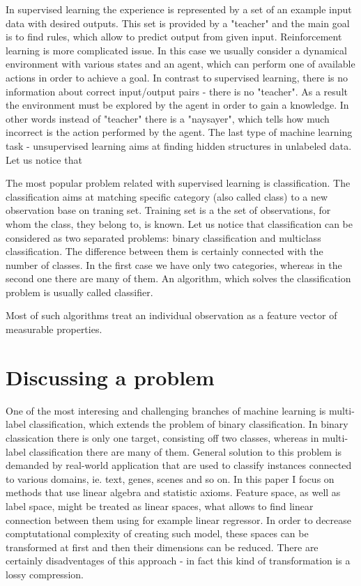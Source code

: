 In supervised learning the experience is represented by a set of an example input data with desired outputs. This set is provided by a "teacher" and the main goal is to find rules, which allow to predict output from given input. Reinforcement learning is more complicated issue. In this case we usually consider a dynamical environment with various states and an agent, which can perform one of available actions in order to achieve a goal. In contrast to supervised learning, there is no information about correct input/output pairs - there is no "teacher". As a result the environment must be explored by the agent in order to gain a knowledge. In other words instead of "teacher" there is a "naysayer", which tells how much  incorrect is the action performed by the agent. The last type of machine learning task - unsupervised learning aims at finding hidden structures in unlabeled data. Let us notice that 

The most popular problem related with supervised learning is classification. The classification aims at matching specific category (also called class) to a new observation base on traning set. Training set is a the set of observations, for whom the class, they belong to, is known. Let us notice that classification can be considered as two separated problems: binary classification and multiclass classification. The difference between them is certainly connected with the number of classes. In the first case we have only two categories, whereas in the second one there are many of them. An algorithm, which solves the classification problem is usually called classifier.  

Most of such algorithms treat an individual observation as a feature vector of measurable properties.  

\section{Discussing a problem}

One of the most interesing and challenging branches of machine learning is multi-label classification, which extends the problem of binary classification. In binary classication there is only one target, consisting off two classes, whereas in multi-label classification there are many of them. General solution to this problem is demanded by real-world application that are used to classify instances connected to various domains, ie. text, genes, scenes and so on. 
In this paper I focus on methods that use linear algebra and statistic axioms. Feature space, as well as label space, might be treated as linear spaces, what allows to find linear connection between them using for example linear regressor. In order to decrease comptutational complexity of creating such model, these spaces can be transformed at first and then their dimensions can be reduced. There are certainly disadventages of this approach - in fact this kind of transformation is a lossy compression.

